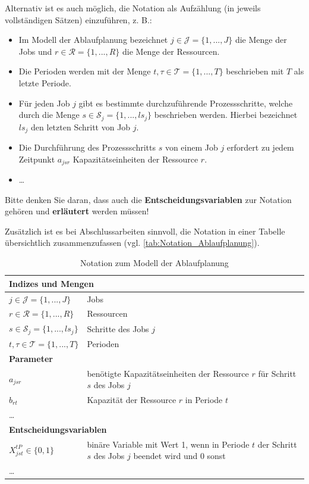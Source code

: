 Alternativ ist es auch möglich, die Notation als Aufzählung (in jeweils vollständigen Sätzen) einzuführen, z. B.:
\begin{itemize}
    \item Im Modell der Ablaufplanung bezeichnet $j \in \mathcal{J} = \{1, ..., J\}$ die Menge der Jobs und $r \in \mathcal{R} = \{1, ..., R\} $ die Menge der Ressourcen. 
    \item Die Perioden werden mit der Menge $t,\tau \in \mathcal{T} = \{1, ..., T\}$ beschrieben mit $T$ als letzte Periode. 
    \item Für jeden Job $j$ gibt es bestimmte durchzuführende Prozessschritte, welche durch die Menge $s \in \mathcal{S}_j  = \{1, ..., ls_j\}$ beschrieben werden. Hierbei bezeichnet $ls_j$ den letzten Schritt von Job $j$.
    \item Die Durchführung des Prozessschritts $s$ von einem Job $j$ erfordert zu jedem Zeitpunkt $a_{jsr}$ Kapazitätseinheiten der Ressource $r$.
    \item \dots
\end{itemize}

Bitte denken Sie daran, dass auch die \textbf{Entscheidungsvariablen} zur Notation gehören und \textbf{erläutert} werden müssen!

Zusätzlich ist es bei Abschlussarbeiten sinnvoll, die Notation in einer Tabelle übersichtlich zusammenzufassen (vgl. \autoref{tab:Notation_Ablaufplanung}).

\begin{table}
    \centering
    \caption{Notation zum Modell der Ablaufplanung}
    \label{tab:Notation_Ablaufplanung}
    \begin{tabular}{l p{11cm}}
        \hline
        \multicolumn{2}{l}{\textbf{Indizes und Mengen}} \\
        \hline
        $j \in \mathcal{J} = \{1, ..., J\} $  & Jobs   \\
		$r \in \mathcal{R} = \{1, ..., R\} $  & Ressourcen  \\
		$s \in \mathcal{S}_j = \{1, ..., ls_j\}$ & Schritte des Jobs $j$ \\
		$t, \tau \in \mathcal{T} = \{1, ..., T\}$ & Perioden \\
        \hline
        \multicolumn{2}{l}{\textbf{Parameter}} \\
        \hline
        $a_{jsr}$ & benötigte Kapazitätseinheiten der Ressource $r$ für Schritt $s$ des Jobs $j$\\
        $b_{r t}$ & Kapazität der Ressource $r$ in Periode $t$ \\
        \dots \\
        \hline
        \multicolumn{2}{l}{\textbf{Entscheidungsvariablen}} \\
        \hline
        $X_{jst}^{tP} \in \{0,1\}$ & binäre Variable mit Wert 1, wenn in Periode $t$ der Schritt $s$ des Jobs $j$ beendet wird und 0 sonst\\
        \dots \\
        \bottomrule
    \end{tabular}
\end{table}

